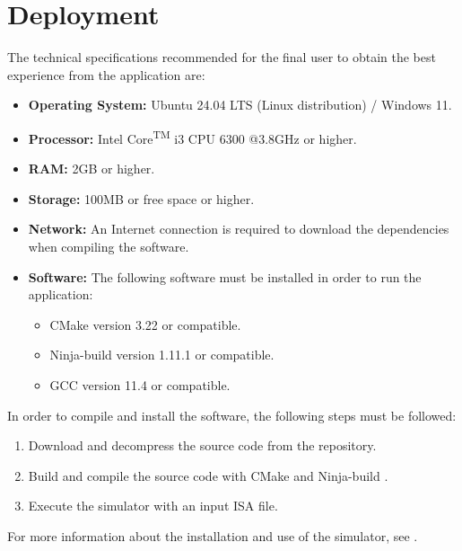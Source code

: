 \section{Deployment}\label{sec:deployment}
The technical specifications recommended for the final user to obtain the best experience from the application are:
\begin{itemize}
  \item \textbf{Operating System:} Ubuntu 24.04 LTS (Linux distribution) / Windows 11.
  \item \textbf{Processor:} Intel\textsuperscript{\textregistered} Core\textsuperscript{TM} i3 CPU 6300 @3.8GHz or higher.
  \item \textbf{\gls{RAM}:} 2GB or higher.
  \item \textbf{Storage:} 100MB or free space or higher.
  \item \textbf{Network:} An Internet connection is required to download the dependencies when compiling the software.
  \item \textbf{Software:} The following software must be installed in order to run the application:
  \begin{itemize}
    \item CMake \parencite{cmake} version 3.22 or compatible.
    \item Ninja-build \parencite{ninja} version 1.11.1 or compatible.
    \item GCC \parencite{gcc} version 11.4 or compatible.
  \end{itemize}
\end{itemize}

\noindent
In order to compile and install the software, the following steps must be followed:
\begin{enumerate}
  \item Download and decompress the source code from the repository.
  \item Build and compile the source code with CMake \parencite{cmake} and Ninja-build \parencite{ninja}.
  \item Execute the simulator with an input \gls{ISA} file.
\end{enumerate}

For more information about the installation and use of the simulator, see .

